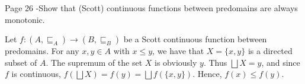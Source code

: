 \begin{problem}{Page 26}
    -Show that (Scott) continuous functions between predomains are always monotonic.
\end{problem}

\begin{solution}
    Let $ f:(A, \sqsubseteq_A) \to (B, \sqsubseteq_B) $ be a Scott continuous function between predomains. For any $x,y \in A$ with $ x \leq y $, we have that
    $ X = \{x,y\} $ is a directed subset of $A$. The supremum of the set $X$ is obviously $y$. Thus $\bigsqcup X = y$, and since $f$ is continuous, $f(\bigsqcup X) = f(y) = \bigsqcup f(\{x,y\})$.
    Hence, $f(x) \leq f(y)$.
\end{solution}